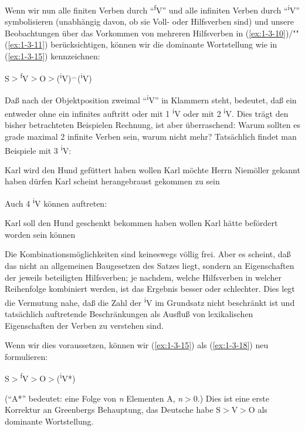 \documentclass[output=paper]{langsci/langscibook}
\begin{document}
Wenn wir nun alle finiten Verben durch "`\textsuperscript{f}V"' und alle infiniten Verben durch
"`\textsuperscript{i}V"' symbolisieren (unabhängig davon, ob sie Voll- oder Hilfsverben sind) und
unsere Beobachtungen über das Vorkommen von mehreren Hilfsverben in (\ref{ex:1-3-10})/""(\ref{ex:1-3-11}) berücksichtigen, können wir die dominante Wortstellung wie in (\ref{ex:1-3-15}) kennzeichnen:
\begin{exe}
\ex\label{ex:1-3-15}
S$>$\textsuperscript{f}V$>$O$>$(\textsuperscript{i}V)$^{\smallfrown}$(\textsuperscript{i}V)
\end{exe}
Daß nach der Objektposition zweimal "`\textsuperscript{i}V"' in Klammern
steht, bedeutet, daß ein  entweder ohne ein infinites
 auftritt oder mit 1 \textsuperscript{i}V oder mit 2
\textsuperscript{i}V. Dies trägt den bisher betrachteten Beispielen
Rechnung, ist aber überraschend: Warum sollten es grade maximal 2
infinite Verben sein, warum nicht mehr? Tatsächlich findet man
Beispiele mit 3 \textsuperscript{i}V:
\begin{exe}
\ex\label{ex:1-3-16}
\begin{xlist}
\ex\label{ex:1-3-16a}  Karl wird den Hund gefüttert haben wollen
\ex\label{ex:1-3-16b} Karl möchte Herrn Niemöller gekannt haben dürfen
\ex\label{ex:1-3-16c} Karl scheint herangebraust gekommen zu sein
\end{xlist}
\end{exe}
Auch 4 \textsuperscript{i}V können auftreten:
\begin{exe}
\ex\label{ex:1-3-17}
\begin{xlist}
\ex\label{ex:1-3-17a}  Karl soll den Hund geschenkt bekommen haben wollen
\ex\label{ex:1-3-17b} Karl hätte befördert worden sein können
\end{xlist}
\end{exe}
Die Kombinationsmöglichkeiten sind keineswegs völlig frei. Aber es scheint, daß das
nicht an allgemeinen Baugesetzen des Satzes liegt, sondern an Eigenschaften der jeweils beteiligten Hilfsverben; je nachdem, welche Hilfsverben in welcher Reihenfolge kombiniert werden, ist das Ergebnis besser oder schlechter. Dies legt die Vermutung nahe, daß die Zahl der \textsuperscript{i}V im Grundsatz nicht beschränkt ist und tatsächlich
auftretende Beschränkungen als Ausfluß von lexikalischen Eigenschaften der Verben
zu verstehen sind.

Wenn wir dies voraussetzen, können wir (\ref{ex:1-3-15}) als (\ref{ex:1-3-18}) neu formulieren:
\begin{exe}
\ex\label{ex:1-3-18}
S$>$\textsuperscript{f}V$>$O$>$(\textsuperscript{i}V*)
\end{exe}
("`A*"' bedeutet: eine Folge von \emph{n} Elementen A, \emph{n}$>$0.) Dies ist eine erste Korrektur an
Greenbergs Behauptung, das Deutsche habe S$>$V$>$O als dominante Wortstellung.
\end{document}
